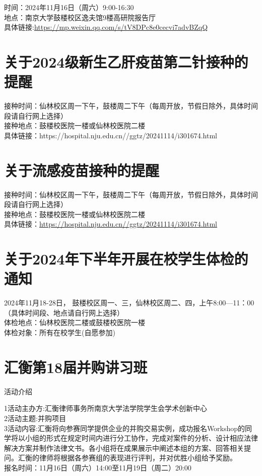 \documentclass[letterpaper, 12pt]{article}
\begin{document}
\begin{multicols}{2}
时间：2024年11月16日（周六）9:00-16:30\\
地点：南京大学鼓楼校区逸夫馆9楼高研院报告厅\\
具体链接:\url{https://mp.weixin.qq.com/s/tV8DPc8e0cecvi7advBZqQ}\\

\section{关于2024级新生乙肝疫苗第二针接种的提醒}
接种时间：仙林校区周一下午，鼓楼周二下午（每周开放，节假日除外，具体时间段请自行网上选择）\\
接种地点：鼓楼校医院一楼或仙林校医院二楼\\
具体链接：https://hospital.nju.edu.cn//ggtz/20241114/i301674.html\\

\section{关于流感疫苗接种的提醒}
接种时间：仙林校区周一下午，鼓楼周二下午（每周开放，节假日除外，具体时间段请自行网上选择）\\
接种地点：鼓楼校医院一楼或仙林校医院二楼\\
具体链接：\url{https://hospital.nju.edu.cn//ggtz/20241114/i301674.html}\\

\section{关于2024年下半年开展在校学生体检的通知}
2024年11月18-28日， 鼓楼校区周一、三，仙林校区周二、四，上午8:00—11：00（具体时间段、地点请自行网上选择）\\
体检地点：仙林校医院二楼或鼓楼校医院一楼\\
体检对象：所有在校学生(自愿参加)\\

\section{汇衡第18届并购讲习班}
活动介绍

1活动主办方:汇衡律师事务所南京大学法学院学生会学术创新中心\\
2活动主题:并购项目\\
3活动内容:汇衡将向参赛同学提供企业的并购交易实例，成功报名Workshop的同学将以小组的形式在规定时间内进行分工协作，完成对案件的分析、设计相应法律解决方案并制作法律文书。各小组将在成果展示中阐述本组的方案、回答相关提问。汇衡的律师将根据各参赛组的表现进行评判，并对优胜小组给予奖励。\\
报名时间：11月16日（周六）14:00至11月19日（周二）20:00


\end{multicols}
\end{document}
